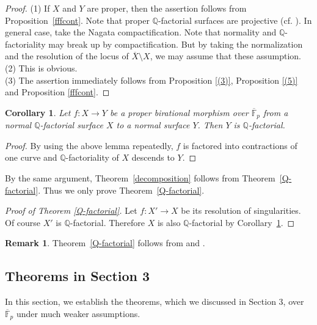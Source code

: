 \documentclass[12pt,twoside]{amsart}
\newtheorem{cor}[thm]{Corollary}
\theoremstyle{definition}
\newtheorem{rem}[thm]{Remark}
\newcommand{\Q}{$\mathbb{Q}$}
\begin{document}
\begin{proof}(1) If $X$ and $Y$ are proper, then 
the assertion follows from Proposition~\ref{fffcont}. 
Note that proper \Q-factorial surfaces are projective 
(cf. \cite[Lemma~2.2]{Fujino}). 
In general case, take the Nagata compactification. 
Note that normality and \Q-factoriality may break up by compactification. 
But by taking the normalization and the resolution of the locus of $\overline{X} \setminus X$, 
we may assume that these assumption. \\
(2) This is obvious.\\
(3) The assertion immediately follows from 
Proposition \ref{(3)}, Proposition \ref{(5)} and Proposition \ref{fffcont}.
\end{proof}


\begin{cor}\label{fpqfaccor}
Let $f:X \to Y$ be a proper birational morphism over $\overline{\mathbb{F}}_p$ 
from a normal \Q-factorial surface $X$ 
to a normal surface $Y$. Then $Y$ is \Q-factorial.
\end{cor}

\begin{proof}
By using the above lemma repeatedly, 
$f$ is factored into contractions of one curve and 
\Q-factoriality of $X$ descends to $Y$.
\end{proof}

By the same argument, Theorem~\ref{decomposition} follows from Theorem~\ref{Q-factorial}. 
Thus we only prove Theorem~\ref{Q-factorial}. 


\begin{proof}[Proof of Theorem \ref{Q-factorial}]
Let $f:X' \to X$ be its resolution of singularities. 
Of course $X'$ is \Q-factorial. 
Therefore $X$ is also \Q-factorial by Corollary~\ref{fpqfaccor}. 
\end{proof}


\begin{rem}
Theorem~\ref{Q-factorial} follows from 
\cite[Corollary~14.22]{Badescu} and \cite[(24.E)]{Matsumura}. 
\end{rem}


\subsection{Theorems in Section 3}

In this section, we establish the theorems,
which we discussed in Section 3, over $\overline{\mathbb{F}}_p$ 
under much weaker assumptions. 
\end{document}
